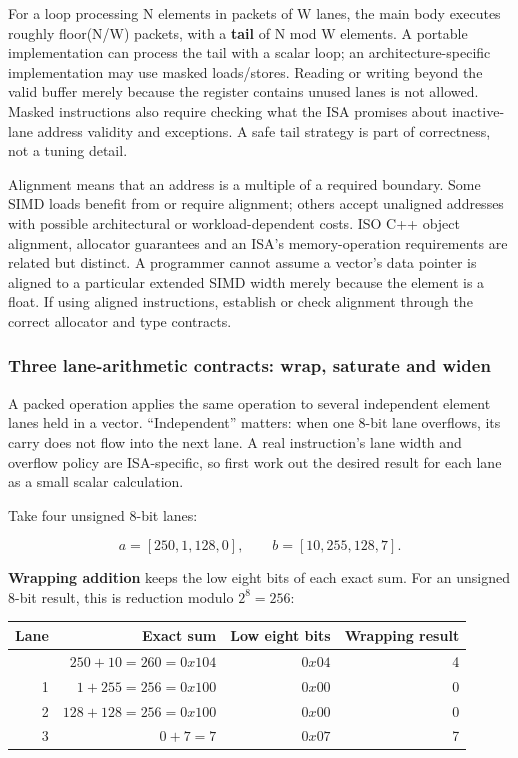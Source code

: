 For a loop processing N elements in packets of W lanes, the main body executes roughly floor(N/W) packets, with a \textbf{tail} of N mod W elements. A portable implementation can process the tail with a scalar loop; an architecture-specific implementation may use masked loads/stores. Reading or writing beyond the valid buffer merely because the register contains unused lanes is not allowed. Masked instructions also require checking what the ISA promises about inactive-lane address validity and exceptions. A safe tail strategy is part of correctness, not a tuning detail.

Alignment means that an address is a multiple of a required boundary. Some SIMD loads benefit from or require alignment; others accept unaligned addresses with possible architectural or workload-dependent costs. ISO C++ object alignment, allocator guarantees and an ISA's memory-operation requirements are related but distinct. A programmer cannot assume a vector's data pointer is aligned to a particular extended SIMD width merely because the element is a float. If using aligned instructions, establish or check alignment through the correct allocator and type contracts.

\subsubsection{Three lane-arithmetic contracts: wrap, saturate and widen}\label{01-foundations-i-ch007-three-lane-arithmetic-contracts-wrap-saturate-and-widen}

A packed operation applies the same operation to several independent element lanes held in a vector. ``Independent'' matters: when one 8-bit lane overflows, its carry does not flow into the next lane. A real instruction's lane width and overflow policy are ISA-specific, so first work out the desired result for each lane as a small scalar calculation.

Take four unsigned 8-bit lanes:

\[
a=[250,1,128,0],\qquad b=[10,255,128,7].
\]

\textbf{Wrapping addition} keeps the low eight bits of each exact sum. For an unsigned 8-bit result, this is reduction modulo \(2^8=256\):

{\def\LTcaptype{none} %
\begin{longtable}[]{@{}rrrr@{}}
\toprule\noalign{}
Lane & Exact sum & Low eight bits & Wrapping result \\
\midrule\noalign{}
\endhead
\bottomrule\noalign{}
\endlastfoot
0 & \(250+10=260=0x104\) & \(0x04\) & 4 \\
1 & \(1+255=256=0x100\) & \(0x00\) & 0 \\
2 & \(128+128=256=0x100\) & \(0x00\) & 0 \\
3 & \(0+7=7\) & \(0x07\) & 7 \\
\end{longtable}
}

